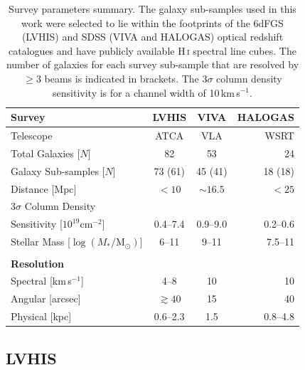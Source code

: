 \documentclass[fleqn,usenatbib]{mnras}
\begin{document}
\begin{table}
	\centering
    \caption{Survey parameters summary. The galaxy sub-samples used in this work were selected to lie within the footprints of the 6dFGS (LVHIS) and SDSS (VIVA and HALOGAS) optical redshift catalogues and have publicly available H\,\textsc{i} spectral line cubes. The number of galaxies for each survey sub-sample that are resolved by $\geq3$ beams is indicated in brackets. The $3\sigma$ column density sensitivity is for a channel width of 10\,km\,s$^{-1}$.}
	\label{table:obs_params}
	\begin{tabular}{lccr}
		\hline
		Survey & LVHIS & VIVA & HALOGAS \\ \hline
		Telescope & ATCA & VLA & WSRT \\
		Total Galaxies [$N$] & 82 & 53 & 24 \\
		Galaxy Sub-samples [$N$] & 73 (61) & 45 (41) & 18 (18) \\
		Distance [Mpc] & $<10$ & $\sim16.5$ & $<25$ \\
        $3\sigma$ Column Density & & & \\ 
        Sensitivity [$10^{19}\mathrm{cm}^{-2}$]  & 0.4--7.4 & 0.9--9.0 & 0.2--0.6 \\
        Stellar Mass [$\log(M_{*}/\mathrm{M}_{\odot})$] & 6--11 & 9--11 & 7.5--11 \\
        \\
        \textbf{Resolution} &  &  & \\
        Spectral [km\,s$^{-1}$] & 4--8 & 10 & 10 \\
		Angular [arcsec] & $\gtrsim40$ & 15 & 40 \\
		Physical [kpc] & 0.6--2.3  & 1.5 & 0.8--4.8 \\ \hline
	\end{tabular}
\end{table}


\subsection{LVHIS}
\label{s-sec:lvhis}
\end{document}
